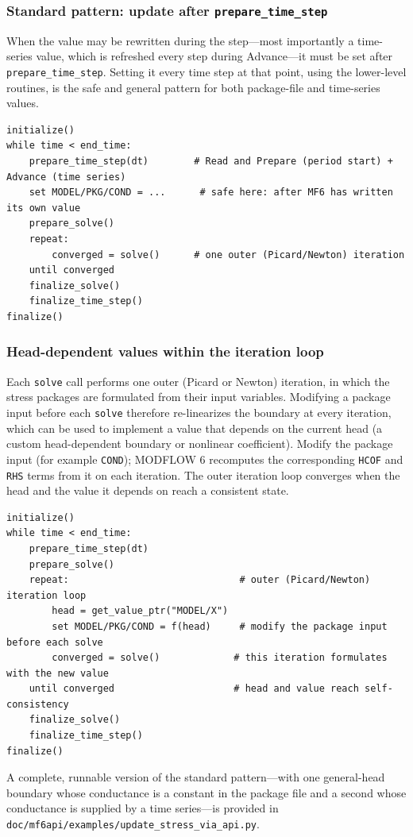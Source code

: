 \subsubsection{Standard pattern: update after \texttt{prepare\_time\_step}}

When the value may be rewritten during the step---most importantly a time-series
value, which is refreshed every step during Advance---it must be set after
\texttt{prepare\_time\_step}. Setting it every time step at that point, using the
lower-level routines, is the safe and general pattern for both package-file and
time-series values.

\begin{lstlisting}[style=pseudocode]
initialize()
while time < end_time:
    prepare_time_step(dt)        # Read and Prepare (period start) + Advance (time series)
    set MODEL/PKG/COND = ...      # safe here: after MF6 has written its own value
    prepare_solve()
    repeat:
        converged = solve()      # one outer (Picard/Newton) iteration
    until converged
    finalize_solve()
    finalize_time_step()
finalize()
\end{lstlisting}

\subsubsection{Head-dependent values within the iteration loop}

Each \texttt{solve} call performs one outer (Picard or Newton) iteration, in which
the stress packages are formulated from their input variables. Modifying a
package input before each \texttt{solve} therefore re-linearizes the boundary at
every iteration, which can be used to implement a value that depends on the
current head (a custom head-dependent boundary or nonlinear coefficient). Modify
the package input (for example \texttt{COND}); MODFLOW 6 recomputes the
corresponding \texttt{HCOF} and \texttt{RHS} terms from it on each iteration. The
outer iteration loop converges when the head and the value it depends on reach a
consistent state.

\begin{lstlisting}[style=pseudocode]
initialize()
while time < end_time:
    prepare_time_step(dt)
    prepare_solve()
    repeat:                              # outer (Picard/Newton) iteration loop
        head = get_value_ptr("MODEL/X")
        set MODEL/PKG/COND = f(head)     # modify the package input before each solve
        converged = solve()             # this iteration formulates with the new value
    until converged                     # head and value reach self-consistency
    finalize_solve()
    finalize_time_step()
finalize()
\end{lstlisting}

A complete, runnable version of the standard pattern---with one general-head
boundary whose conductance is a constant in the package file and a second whose
conductance is supplied by a time series---is provided in
\texttt{doc/mf6api/examples/update\_stress\_via\_api.py}.
